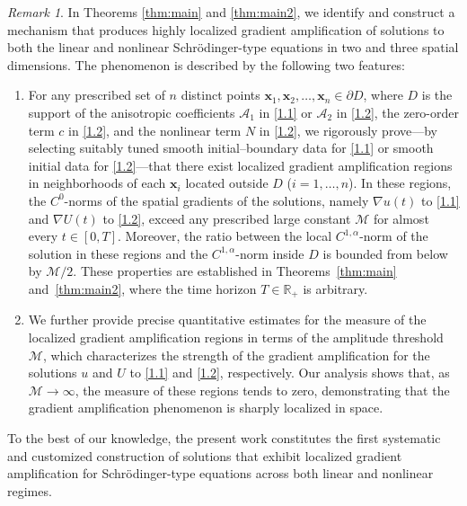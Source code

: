 \documentclass[11pt,reqno,oneside]{amsart}
\numberwithin{equation}{section}
\theoremstyle{definition}
\theoremstyle{remark}
\newtheorem{remark}[theorem]{Remark}
\numberwithin{equation}{section}
\begin{document}
    \begin{remark}
    In Theorems \ref{thm:main} and \ref{thm:main2}, we identify and construct a mechanism that produces highly localized gradient amplification of solutions to both the linear and nonlinear Schr\"{o}dinger-type equations in two and three spatial dimensions. The phenomenon is described by the following two features:

\begin{enumerate}
    \renewcommand{\labelenumi}{(\roman{enumi})}
    \item
    For any prescribed set of $n$ distinct points 
    $\mathbf{x}_1,\mathbf{x}_2,\ldots,\mathbf{x}_n \in \partial D$, 
    where $D$ is the support of the anisotropic coefficients 
    $\mathscr{A}_1$ in \eqref{1.1} or $\mathscr{A}_2$ in \eqref{1.2}, 
    the zero-order term $c$ in \eqref{1.2}, and the nonlinear term $N$ in \eqref{1.2},
    we rigorously prove---by selecting suitably tuned smooth initial--boundary data
    for \eqref{1.1} or smooth initial data for \eqref{1.2}---that there exist
    localized gradient amplification regions in neighborhoods of each $\mathbf{x}_i$
    located outside $D$ ($i=1,\ldots,n$).
    In these regions, the $C^{0}$-norms of the spatial gradients of the solutions,
    namely $\nabla u(t)$ to \eqref{1.1} and $\nabla U(t)$ to \eqref{1.2},
    exceed any prescribed large constant $\mathcal{M}$ for almost every
    $t\in[0,T]$. Moreover, the ratio between the local $C^{1,\alpha}$-norm
    of the solution in these regions and the $C^{1,\alpha}$-norm inside $D$
    is bounded from below by $\mathcal{M}/2$.
    These properties are established in Theorems~\ref{thm:main}
    and~\ref{thm:main2}, where the time horizon $T\in\mathbb{R}_+$ is arbitrary.

    \item
    We further provide precise quantitative estimates for the measure of the
    localized gradient amplification regions in terms of the amplitude threshold
    $\mathcal{M}$, which characterizes the strength of the gradient amplification
    for the solutions $u$ and $U$ to \eqref{1.1} and \eqref{1.2}, respectively.
    Our analysis shows that, as $\mathcal{M} \to \infty$, the measure of these regions
    tends to zero, demonstrating that the gradient amplification phenomenon is
    sharply localized in space.
\end{enumerate}
    \end{remark}
	
		

	  To the best of our knowledge, the present work constitutes the first systematic and customized construction of solutions that exhibit localized gradient amplification for Schr\"{o}dinger-type equations across both linear and nonlinear regimes. 
	  
\end{document}
